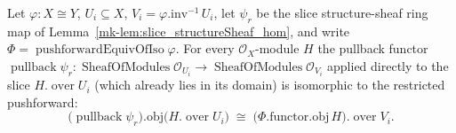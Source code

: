 \begin{lemma}\label{mk-lem:pushforward_slice_pullback_iso}
  \leanok

  Let \(\varphi : X \cong Y\), \(U_i \subseteq X\), \(V_i = \varphi.\mathrm{inv}^{-1}\,U_i\), let
  \(\psi_r\) be the slice structure-sheaf ring map of Lemma~\ref{mk-lem:slice_structureSheaf_hom}, and write
  \(\Phi = \operatorname{pushforwardEquivOfIso}\varphi\). For every \(\mathcal{O}_X\)-module \(H\) the
  pullback functor \(\operatorname{pullback}\psi_r : \operatorname{SheafOfModules}\mathcal{O}_{U_i} \to
  \operatorname{SheafOfModules}\mathcal{O}_{V_i}\) applied directly to the slice
  \(H.\operatorname{over} U_i\) (which already lies in its domain) is isomorphic to the restricted
  pushforward:
  \[
    \bigl(\operatorname{pullback}\psi_r\bigr).\mathrm{obj}\bigl(H.\operatorname{over} U_i\bigr)
      \;\cong\;
    \bigl(\Phi.\mathrm{functor}.\mathrm{obj}\, H\bigr).\operatorname{over} V_i .
  \]
\end{lemma}
